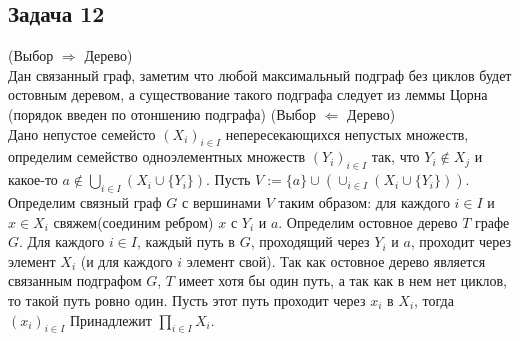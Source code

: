 \subsection*{Задача 12}
	(Выбор $\Rightarrow$ Дерево)\\
	Дан связанный граф, заметим что любой максимальный подграф без циклов будет остовным деревом, а существование такого подграфа следует из леммы Цорна (порядок введен по отоншению подграфа)
	\vskip 0.1in
	(Выбор $\Leftarrow$ Дерево)\\
	Дано непустое семейсто $(X_i)_{i \in I}$ непересекающихся непустых множеств, определим семейство одноэлементных множеств $(Y_i)_{i \in I}$ так, что $Y_i \notin X_j$ и какое-то $a \notin \bigcup_{i \in I}(X_i \cup \{Y_i\})$. Пусть $V := \{a\} \cup (\cup_{i \in I} (X_i \cup \{Y_i\}))$. Определим связный граф $G$ с вершинами $V$ таким образом: для каждого $i \in I$ и $x \in X_i$ свяжем(соединим ребром) $x$ с $Y_i$ и $a$. Определим остовное дерево $T$ графе $G$. Для каждого $i \in I$, каждый путь в $G$, проходящий через $Y_i$ и $a$, проходит через элемент $X_i$ (и для каждого $i$ элемент свой). Так как остовное дерево является связанным подграфом $G$, $T$ имеет хотя бы один путь, а так как в нем нет циклов, то такой путь ровно один. Пусть этот путь проходит через $x_i$ в $X_i$, тогда $(x_i)_{i \in I}$ Принадлежит $\prod_{i \in I}X_i$.

\begin{comment}
	Бесконечный граф является связным, если для каждой пары вершин есть конечный путь с концами в этих вершинах.\\
	Деревья внутри графа могут быть частично упорядочены отношением подграфа. Любая бесконечная цепь имеет верхнюю грань (объединение деревьев в цепочке). Тогда выполнены условия леммы Цорна, значит частичный порядок имеет максимальный элемент, это и есть остовное дерево.
	\vskip 0.1in
	Пусть остовное дерево существует.\\
	Аксиома выбора: для любого семейства $\{X_i\}_{i \in I}$ непустых множеств существует $f: I \to \bigcup X$, (остовное дерево $\mapsto$ функция выбора)\\
	Построим связный граф $G$ с набором вершин $U$. $V = \{r\} \cup (\bigcup_{i \in I} (X_i \cup \{O_i\}))$, где $\{X_i\}_{i \in I}$ -- семейство непересекающихся непустых множеств, $\{O_i\}_{i \in I}$ семейство, такое что $O_i \notin X_j$, $r \in \bigcup_{i \in I}(X_i \cup \{O_i\})$\\
	$\forall i \in I\ x \in X_i$ соединим $x$ и $O_i$ или $r$. Рассмотрим остовное дерево в графе $G$. $\forall i \in I$ и для любого пути в $G$ соединим $O_i$ и $r$. $(X_i)_{i \in I}$ -- попарно неперсекающиеся непустые множества. $O_i := (X,i)_{\forall }$
\end{comment}